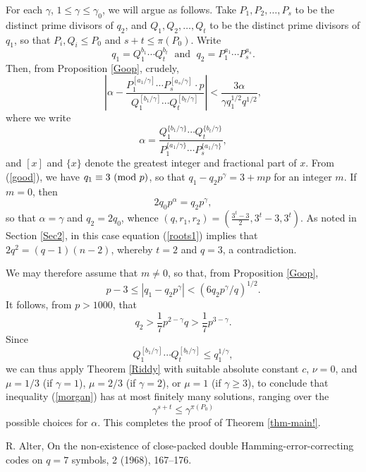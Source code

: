 \documentclass{amsart}
\def\mod#1{{\ifmmode\text{\rm\ (mod~$#1$)}
\else\discretionary{}{}{\hbox{ }}\rm(mod~$#1$)\fi}}
\begin{document}
{For each $\gamma$, $1 \leq \gamma \leq \gamma_0$, we will argue as follows.
Take $P_1, P_2, \ldots, P_s$ to be the distinct prime divisors of $q_2$, and $Q_1, Q_2, \ldots, Q_t$ to be the distinct prime divisors of $q_1$, so that $P_i, Q_i \leq P_0$ and $s+t \leq \pi (P_0)$. Write
$$
q_1 = Q_1^{b_1} \cdots Q_t^{b_t} \; \mbox{ and } \;
q_2=P_1^{a_1} \cdots P_s^{a_s}.
$$
Then, from Proposition \ref{Goop}, crudely,
\begin{equation} \label{morgan}
\left| \alpha - \frac{P_1^{[a_1/\gamma ]} \cdots P_s^{[a_s/\gamma ]} \cdot p }{Q_1^{[ b_1/\gamma ]} \cdots Q_t^{[ b_t/\gamma ]}}
\right| < \frac{3 \alpha}{ \gamma q_1^{1/2} q^{1/2}},
\end{equation}
where we write
$$
\alpha =  \frac{Q_1^{ \{ b_1/\gamma \} } \cdots Q_t^{ \{ b_t/\gamma \} }}{P_1^{\{ a_1/\gamma \}} \cdots P_s^{ \{ a_1/\gamma \} } },
$$
and $[x]$ and $\{ x \}$ denote the greatest integer and fractional part of $x$. From (\ref{good}), we have
$q_1 \equiv 3 \mod{p}$, so that $q_1-q_2p^\gamma = 3+mp$ for an integer $m$. If $m=0$, then
$$
2 q_0 p^\alpha = q_2 p^\gamma,
$$
so that $\alpha=\gamma$ and $q_2=2q_0$, whence
$(q,r_1,r_2) = \left( \frac{3^t-3}{2}, 3^t-3,3^t \right)$. As noted in Section \ref{Sec2}, in this case equation (\ref{roots1}) implies that
$2q^2 = (q-1) (n-2)$,
whereby $t=2$ and $q=3$, a contradiction.

We may therefore assume that $m \neq 0$, so that, from Proposition \ref{Goop}, 
$$
p-3 \leq \left| q_1-q_2p^\gamma \right| < \left( 6q_2p^\gamma/q \right)^{1/2}.
$$
It follows, from $p > 1000$, that
$$
q_2 > \frac{1}{7} p^{2-\gamma} q > \frac{1}{7} p^{3-\gamma}.
$$
Since
$$
Q_1^{[ b_1/\gamma ]} \cdots Q_t^{[ b_t/\gamma ]} \leq q_1^{1/\gamma},
$$
we can thus apply Theorem \ref{Riddy} with suitable absolute constant $c$, $\nu=0$, and $\mu = 1/3$ (if $\gamma=1$), $\mu = 2/3$ (if $\gamma=2$), or $\mu=1$ (if $\gamma \geq 3$), to conclude that inequality (\ref{morgan}) has at most finitely many solutions, ranging over the 
$$
\gamma^{s+t} \leq \gamma^{\pi (P_0)}
$$
possible choices for $\alpha$. This completes the proof of Theorem \ref{thm-main!}.


\begin{thebibliography}{}

R. Alter,
\newblock On the non-existence of close-packed double Hamming-error-correcting codes on $q = 7$ symbols,
  2 (1968), 167--176.


\end{thebibliography}}
\end{document}
